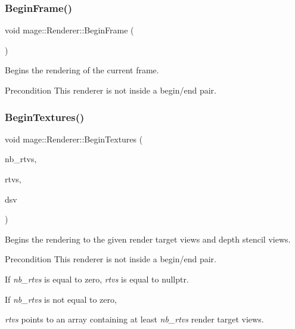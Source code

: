 \subsubsection{\texorpdfstring{Begin\+Frame()}{BeginFrame()}}
{\footnotesize\ttfamily void mage\+::\+Renderer\+::\+Begin\+Frame (\begin{DoxyParamCaption}{ }\end{DoxyParamCaption})}

Begins the rendering of the current frame.

\begin{DoxyPrecond}{Precondition}
This renderer is not inside a begin/end pair. 
\end{DoxyPrecond}
\hypertarget{classmage_1_1_renderer_a2ffbc529a9f57ebd724273bbf17413fc}{}\label{classmage_1_1_renderer_a2ffbc529a9f57ebd724273bbf17413fc} 
\subsubsection{\texorpdfstring{Begin\+Textures()}{BeginTextures()}}
{\footnotesize\ttfamily void mage\+::\+Renderer\+::\+Begin\+Textures (\begin{DoxyParamCaption}\item[{U\+I\+NT}]{nb\+\_\+rtvs,  }\item[{I\+D3\+D11\+Render\+Target\+View $\ast$const $\ast$}]{rtvs,  }\item[{I\+D3\+D11\+Depth\+Stencil\+View $\ast$}]{dsv }\end{DoxyParamCaption})}

Begins the rendering to the given render target views and depth stencil views.

\begin{DoxyPrecond}{Precondition}
This renderer is not inside a begin/end pair. 

If {\itshape nb\+\_\+rtvs} is equal to zero, {\itshape rtvs} is equal to {\ttfamily nullptr}. 

If {\itshape nb\+\_\+rtvs} is not equal to zero, 

{\itshape rtvs} points to an array containing at least {\itshape nb\+\_\+rtvs} render target views. 
\end{DoxyPrecond}

